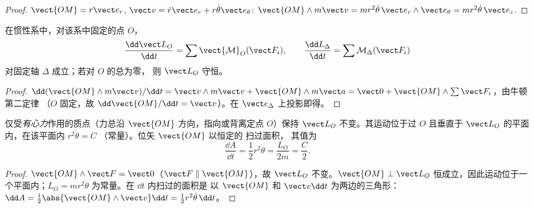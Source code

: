 \begin{proof}
$\vect{OM} = r\vect e_r$, $\vect v = \dot r\vect e_r + r\dot\theta\vect e_\theta$:
$\vect{OM}\wedge m\vect v = mr^2\dot\theta\,\vect e_r\wedge\vect e_\theta = mr^2\dot\theta\,\vect e_z$.
\end{proof}

\begin{theorem}[角动量定理]\label{thm:b1:angular-momentum:theorem}
在惯性系中，对该系中固定的点 $O$，
\[
\frac{\dd\vect L_O}{\dd t} = \sum\vect{\mathcal M}_O(\vect F_i),
\qquad
\frac{\dd L_\Delta}{\dd t} = \sum\mathcal M_\Delta(\vect F_i)
\]
对固定轴 $\Delta$ 成立；若对 $O$ 的总为零，
则 $\vect L_O$ 守恒。
\end{theorem}

\begin{proof}
$\dd(\vect{OM}\wedge m\vect v)/\dd t = \vect v\wedge m\vect v + \vect{OM}\wedge m\vect a
= \vect 0 + \vect{OM}\wedge\sum\vect F_i$，由牛顿第二定律
（$O$ 固定，故 $\dd\vect{OM}/\dd t = \vect v$）。在 $\vect e_\Delta$ 上投影即得。
\end{proof}

\begin{corollary}\label{cor:b1:angular-momentum:central}
仅受\emph{有心力}作用的质点（力总沿
$\vect{OM}$ 方向，指向或背离定点 $O$）保持 $\vect L_O$ 不变。其运动位于过 $O$
且垂直于 $\vect L_O$ 的平面内，在该平面内 $r^2\dot\theta = C$
（常量）。位矢 $\vect{OM}$ 以恒定的
\emph{}扫过面积，
其值为
\[
\frac{\dd A}{\dd t} = \frac12 r^2\dot\theta = \frac{L_O}{2m} = \frac{C}{2} .
\]
\end{corollary}

\begin{proof}
$\vect{OM}\wedge\vect F = \vect 0$（$\vect F \parallel \vect{OM}$），故 $\vect L_O$
不变。$\vect{OM}\perp\vect L_O$ 恒成立，因此运动位于一个平面内；$L_O =
mr^2\dot\theta$ 为常量。在 $\dd t$ 内扫过的面积是
以 $\vect{OM}$ 和 $\vect v\dd t$ 为两边的三角形：$\dd A = \tfrac12\abs{\vect{OM}
\wedge\vect v}\dd t = \tfrac12 r^2\dot\theta\,\dd t$。
\end{proof}

